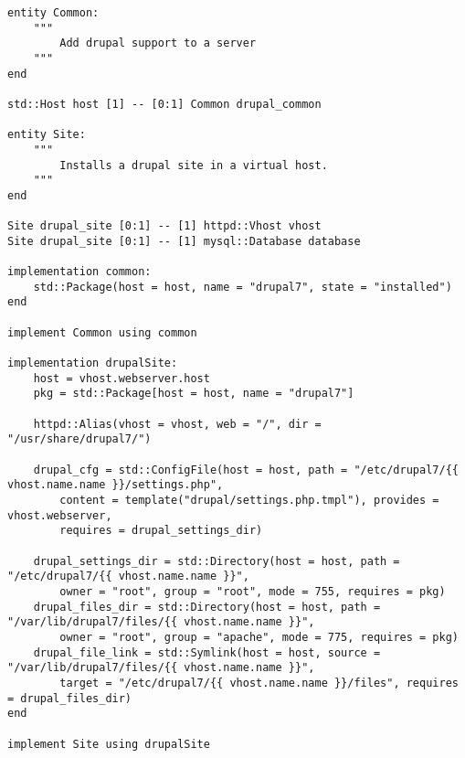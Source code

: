 \begin{minipage}
\begin{lstlisting}[label=listing:drupal_model]
entity Common:
    """
        Add drupal support to a server
    """
end

std::Host host [1] -- [0:1] Common drupal_common

entity Site:
    """
        Installs a drupal site in a virtual host.
    """
end

Site drupal_site [0:1] -- [1] httpd::Vhost vhost
Site drupal_site [0:1] -- [1] mysql::Database database

implementation common:
    std::Package(host = host, name = "drupal7", state = "installed")
end

implement Common using common

implementation drupalSite:
    host = vhost.webserver.host
    pkg = std::Package[host = host, name = "drupal7"]

    httpd::Alias(vhost = vhost, web = "/", dir = "/usr/share/drupal7/")

    drupal_cfg = std::ConfigFile(host = host, path = "/etc/drupal7/{{ vhost.name.name }}/settings.php",
        content = template("drupal/settings.php.tmpl"), provides = vhost.webserver,
        requires = drupal_settings_dir)
    
    drupal_settings_dir = std::Directory(host = host, path = "/etc/drupal7/{{ vhost.name.name }}",
        owner = "root", group = "root", mode = 755, requires = pkg)
    drupal_files_dir = std::Directory(host = host, path = "/var/lib/drupal7/files/{{ vhost.name.name }}",
        owner = "root", group = "apache", mode = 775, requires = pkg)
    drupal_file_link = std::Symlink(host = host, source = "/var/lib/drupal7/files/{{ vhost.name.name }}",
        target = "/etc/drupal7/{{ vhost.name.name }}/files", requires = drupal_files_dir)
end

implement Site using drupalSite
\end{lstlisting}
\end{minipage}
